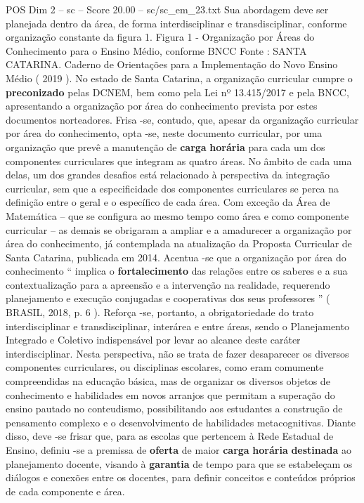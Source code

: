 \begin{textsample}{POS Dim 2 – sc – Score 20.00 – sc/sc\_em\_23.txt}
Sua abordagem deve ser planejada dentro da área, de forma interdisciplinar e transdisciplinar, conforme organização constante da figura 1.
Figura 1 - Organização por Áreas do Conhecimento para o Ensino Médio, conforme BNCC Fonte : SANTA CATARINA.
Caderno de Orientações para a Implementação do Novo Ensino Médio ( 2019 ).
No estado de Santa Catarina, a organização curricular cumpre o \textbf{preconizado} pelas DCNEM, bem como pela Lei nº 13.415/2017 e pela BNCC, apresentando a organização por área do conhecimento prevista por estes documentos norteadores.
Frisa -se, contudo, que, apesar da organização curricular por área do conhecimento, opta -se, neste documento curricular, por uma organização que prevê a manutenção de \textbf{carga} \textbf{horária} para cada um dos componentes curriculares que integram as quatro áreas.
No âmbito de cada uma delas, um dos grandes desafios está relacionado à perspectiva da integração curricular, sem que a especificidade dos componentes curriculares se perca na definição entre o geral e o específico de cada área.
Com exceção da Área de Matemática – que se configura ao mesmo tempo como área e como componente curricular – as demais se obrigaram a ampliar e a amadurecer a organização por área do conhecimento, já contemplada na atualização da Proposta Curricular de Santa Catarina, publicada em 2014.
Acentua -se que a organização por área do conhecimento “ implica o \textbf{fortalecimento} das relações entre os saberes e a sua contextualização para a apreensão e a intervenção na realidade, requerendo planejamento e execução conjugadas e cooperativas dos seus professores ” ( BRASIL, 2018, p. 6 ).
Reforça -se, portanto, a obrigatoriedade do trato interdisciplinar e transdisciplinar, interárea e entre áreas, sendo o Planejamento Integrado e Coletivo indispensável por levar ao alcance deste caráter interdisciplinar.
Nesta perspectiva, não se trata de fazer desaparecer os diversos componentes curriculares, ou disciplinas escolares, como eram comumente compreendidas na educação básica, mas de organizar os diversos objetos de conhecimento e habilidades em novos arranjos que permitam a superação do ensino pautado no conteudismo, possibilitando aos estudantes a construção de pensamento complexo e o desenvolvimento de habilidades metacognitivas.
Diante disso, deve -se frisar que, para as escolas que pertencem à Rede Estadual de Ensino, definiu -se a premissa de \textbf{oferta} de maior \textbf{carga} \textbf{horária} \textbf{destinada} ao planejamento docente, visando à \textbf{garantia} de tempo para que se estabeleçam os diálogos e conexões entre os docentes, para definir conceitos e conteúdos próprios de cada componente e área.

\end{textsample}

